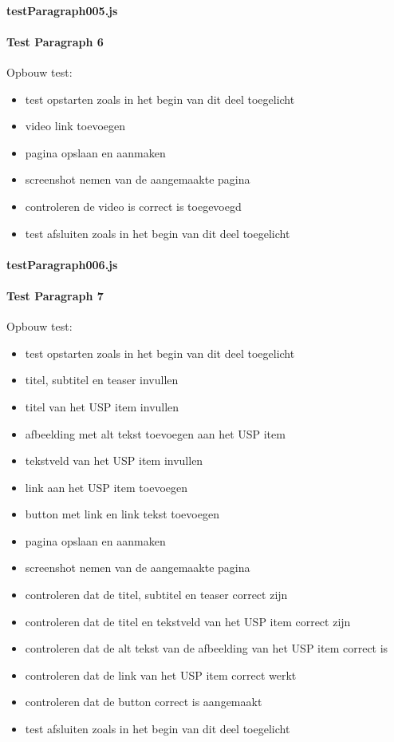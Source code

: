 \paragraph{testParagraph005.js}


\clearpage
\paragraph{Test Paragraph 6}
\label{test6}
Opbouw test: 
\begin{itemize}
\item test opstarten zoals in het begin van dit deel toegelicht
\item video link toevoegen
\item pagina opslaan en aanmaken
\item screenshot nemen van de aangemaakte pagina
\item controleren de video is correct is toegevoegd
\item test afsluiten zoals in het begin van dit deel toegelicht
\end{itemize}
\paragraph{testParagraph006.js}


\clearpage
\paragraph{Test Paragraph 7}
\label{test7}
Opbouw test: 
\begin{itemize}
\item test opstarten zoals in het begin van dit deel toegelicht
\item titel, subtitel en teaser invullen
\item titel van het USP item invullen
\item afbeelding met alt tekst toevoegen aan het USP item
\item tekstveld van het USP item invullen
\item link aan het USP item toevoegen
\item button met link en link tekst toevoegen
\item pagina opslaan en aanmaken
\item screenshot nemen van de aangemaakte pagina
\item controleren dat de titel, subtitel en teaser correct zijn
\item controleren dat de titel en tekstveld van het USP item correct zijn
\item controleren dat de alt tekst van de afbeelding van het USP item correct is
\item controleren dat de link van het USP item correct werkt
\item controleren dat de button correct is aangemaakt
\item test afsluiten zoals in het begin van dit deel toegelicht
\end{itemize}
\clearpage
